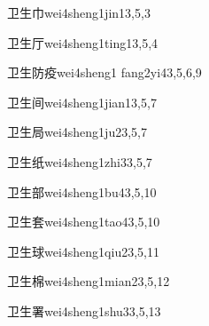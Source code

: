 \begin{verbete}{卫生巾}{wei4sheng1jin1}{3,5,3}
\end{verbete}

\begin{verbete}{卫生厅}{wei4sheng1ting1}{3,5,4}
\end{verbete}

\begin{verbete}{卫生防疫}{wei4sheng1 fang2yi4}{3,5,6,9}
\end{verbete}

\begin{verbete}{卫生间}{wei4sheng1jian1}{3,5,7}
\end{verbete}

\begin{verbete}{卫生局}{wei4sheng1ju2}{3,5,7}
\end{verbete}

\begin{verbete}{卫生纸}{wei4sheng1zhi3}{3,5,7}
\end{verbete}

\begin{verbete}{卫生部}{wei4sheng1bu4}{3,5,10}
\end{verbete}

\begin{verbete}{卫生套}{wei4sheng1tao4}{3,5,10}
\end{verbete}

\begin{verbete}{卫生球}{wei4sheng1qiu2}{3,5,11}
\end{verbete}

\begin{verbete}{卫生棉}{wei4sheng1mian2}{3,5,12}
\end{verbete}

\begin{verbete}{卫生署}{wei4sheng1shu3}{3,5,13}
\end{verbete}

